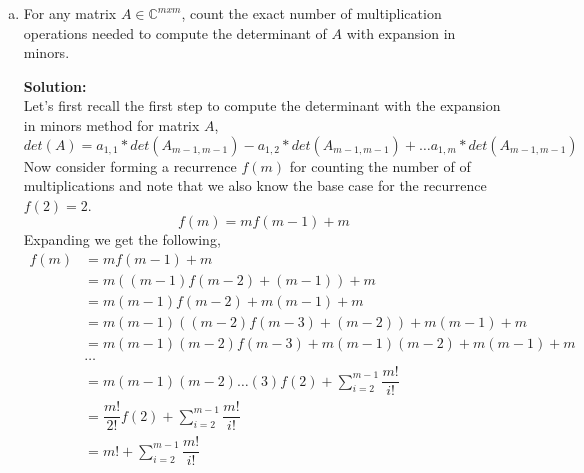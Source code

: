 \documentclass[12pt]{article}
\makeatletter
\theoremstyle{homework}
\newenvironment{exercise}[1]
{\def\@currentlabel{#1}\exercisecore}
{\endexercisecore}
\newcommand{\localhead}[1]{\par\smallskip\noindent\textbf{#1}\nobreak\\}%
\newcommand\solution{\localhead{Solution:}}
\newcommand{\Cplx}{\ensuremath{\mathbb C}}
\let\CC\Cplx
\makeatother
\begin{document}
\begin{exercise}{P6}
\begin{enumerate}[a.]
          \item For any matrix $A \in \CC^{mxm}$, count the exact number of multiplication 
          operations needed to compute the determinant of $A$ with expansion in minors.\\
          \solution Let's first recall the first step to compute the determinant with the expansion in minors method for
          matrix $A$, 
          \begin{equation*}
            det(A) = a_{1,1}*det(A_{m-1,m-1}) - a_{1,2}*det(A_{m-1,m-1}) + \dots a_{1,m}*det(A_{m-1,m-1})
          \end{equation*}
          Now consider forming a recurrence $f(m)$ for counting the number of of multiplications and note that we also know the base case for the 
          recurrence $f(2) = 2$.
          \begin{equation*}
            f(m) = mf(m-1) + m 
          \end{equation*}
          Expanding we get the following, 
          \begin{align*}
            f(m) &= mf(m-1) + m \\
            &= m((m-1)f(m-2) + (m-1)) + m \\
            &= m(m-1)f(m-2) + m(m-1) + m \\
            &= m(m-1)((m-2)f(m-3) + (m-2)) + m(m-1) + m \\
            &= m(m-1)(m-2)f(m-3) + m(m-1)(m-2) + m(m-1) + m \\
            &\dots\\
            &= m(m-1)(m-2)\dots(3)f(2) + \sum_{i = 2}^{m-1} \dfrac{m!}{i!}\\
            &= \dfrac{m!}{2!}f(2) + \sum_{i = 2}^{m-1} \dfrac{m!}{i!}\\
            &= m! + \sum_{i = 2}^{m-1} \dfrac{m!}{i!}
          \end{align*}
          \vspace{.15in}


\end{enumerate}
\end{exercise}
\end{document}
